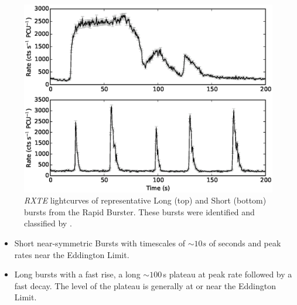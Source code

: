 \begin{figure}
  \centering
  \includegraphics[width=.9\linewidth, trim={0.8cm 0 1.4cm 0},clip]{images/bagnoli_bursts.eps}
  \caption[\textit{RXTE} lightcurves of representative Long (top) and Short (bottom) bursts from the Rapid Burster.]{\small \textit{RXTE} lightcurves of representative Long (top) and Short (bottom) bursts from the Rapid Burster.  These bursts were identified and classified by \citet{Bagnoli_PopStudy}.}
  \label{fig:bagnoli_lcs}
\end{figure}

\begin{itemize}
\item Short near-symmetric Bursts with timescales of $\sim10s$ of seconds and peak rates near the Eddington Limit.
\item Long bursts with a fast rise, a long $\sim100$\,s plateau at peak rate followed by a fast decay.  The level of the plateau is generally at or near the Eddington Limit.
\end{itemize}

